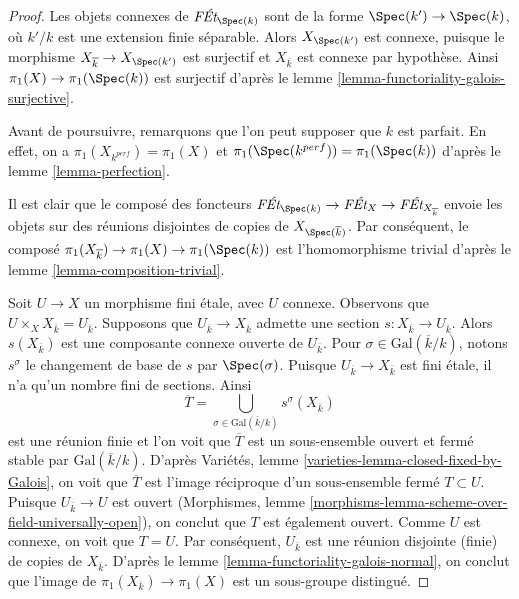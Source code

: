 \begin{proof}
Les objets connexes de $\textit{F\'Et}_{\Spec(k)}$ sont de la forme
$\Spec(k') \to \Spec(k)$, où $k'/k$ est une extension finie séparable.
Alors $X_{\Spec(k')}$ est connexe, puisque le morphisme
$X_{\overline{k}} \to X_{\Spec(k')}$ est surjectif et
$X_{\overline{k}}$ est connexe par hypothèse. Ainsi
$\pi_1(X) \to \pi_1(\Spec(k))$ est surjectif d'après le
lemme \ref{lemma-functoriality-galois-surjective}.

\medskip\noindent
Avant de poursuivre, remarquons que l'on peut supposer que $k$ est parfait.
En effet, on a $\pi_1(X_{k^{perf}}) = \pi_1(X)$ et
$\pi_1(\Spec(k^{perf})) = \pi_1(\Spec(k))$ d'après le lemme \ref{lemma-perfection}.

\medskip\noindent
Il est clair que le composé des foncteurs
$\textit{F\'Et}_{\Spec(k)} \to \textit{F\'Et}_X \to
\textit{F\'Et}_{X_{\overline{k}}}$ envoie les objets sur des réunions disjointes
de copies de $X_{\Spec(\overline{k})}$. Par conséquent, le composé
$\pi_1(X_{\overline{k}}) \to \pi_1(X) \to \pi_1(\Spec(k))$
est l'homomorphisme trivial d'après le lemme \ref{lemma-composition-trivial}.

\medskip\noindent
Soit $U \to X$ un morphisme fini \'etale, avec $U$ connexe.
Observons que $U \times_X X_{\overline{k}} = U_{\overline{k}}$.
Supposons que $U_{\overline{k}} \to X_{\overline{k}}$
admette une section $s : X_{\overline{k}} \to U_{\overline{k}}$.
Alors $s(X_{\overline{k}})$ est une composante connexe ouverte de
$U_{\overline{k}}$. Pour $\sigma \in \text{Gal}(\overline{k}/k)$,
notons $s^\sigma$ le changement de base de $s$ par $\Spec(\sigma)$.
Puisque $U_{\overline{k}} \to X_{\overline{k}}$ est fini \'etale,
il n'a qu'un nombre fini de sections. Ainsi
$$
\overline{T} = \bigcup_{\sigma \in \text{Gal}(\overline{k}/k)} s^\sigma(X_{\overline{k}})
$$
est une réunion finie et l'on voit que $\overline{T}$ est un
sous-ensemble ouvert et fermé stable par $\text{Gal}(\overline{k}/k)$.
D'après Variétés, lemme \ref{varieties-lemma-closed-fixed-by-Galois},
on voit que $\overline{T}$ est l'image réciproque d'un sous-ensemble fermé
$T \subset U$. Puisque $U_{\overline{k}} \to U$ est ouvert
(Morphismes, lemme \ref{morphisms-lemma-scheme-over-field-universally-open}),
on conclut que $T$ est également ouvert. Comme $U$ est connexe, on
voit que $T = U$. Par conséquent, $U_{\overline{k}}$ est une réunion disjointe (finie)
de copies de $X_{\overline{k}}$. D'après le
lemme \ref{lemma-functoriality-galois-normal}, on conclut que l'image de
$\pi_1(X_{\overline{k}}) \to \pi_1(X)$ est un sous-groupe distingué.


\end{proof}
